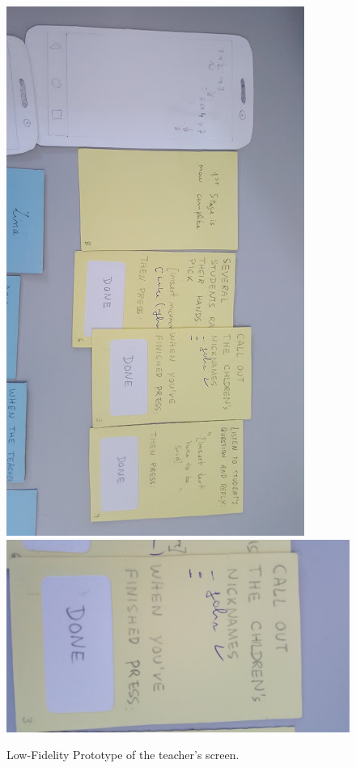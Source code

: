 \documentclass[runningheads]{llncs}
\begin{document}
\begin{figure}
    \centering
    \includegraphics[scale = 0.38, angle = 90]{paper_proto1.jpg}
    \includegraphics[scale = 0.12, angle = 90]{paper_proto3.jpg}
    \caption{Low-Fidelity Prototype of the teacher's screen.}
    \label{fig:LFP}
\end{figure}
\end{document}
